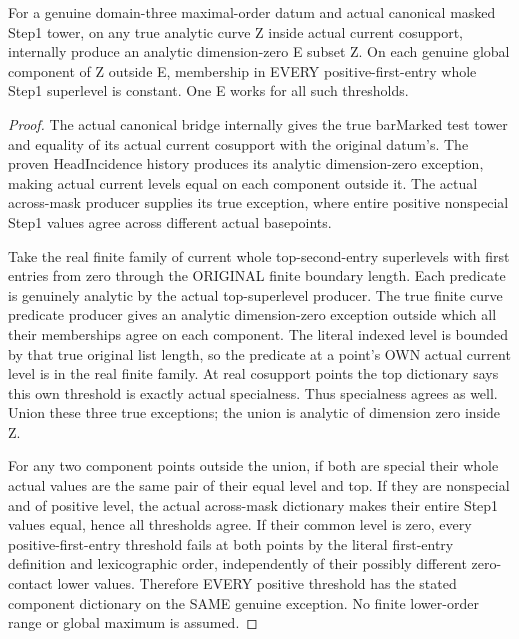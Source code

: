 \begin{theorem}
\label{hir:step-one-positive-actual-curve-threshold-dictionary}
\leanok
{}
For a genuine domain-three maximal-order datum and actual canonical masked
Step1 tower, on any true analytic curve Z inside actual current cosupport,
internally produce an analytic dimension-zero E subset Z. On each genuine
global component of Z outside E, membership in EVERY positive-first-entry
whole Step1 superlevel is constant. One E works for all such thresholds.
\end{theorem}
\begin{proof}
The actual canonical bridge internally gives the true barMarked test tower
and equality of its actual current cosupport with the original datum's.
The proven HeadIncidence history produces its analytic dimension-zero
exception, making actual current levels equal on each component outside it.
The actual across-mask producer supplies its true exception, where entire
positive nonspecial Step1 values agree across different actual basepoints.

Take the real finite family of current whole top-second-entry superlevels
with first entries from zero through the ORIGINAL finite boundary length.
Each predicate is genuinely analytic by the actual top-superlevel producer.
The true finite curve predicate producer gives an analytic dimension-zero
exception outside which all their memberships agree on each component.
The literal indexed level is bounded by that true original list length, so
the predicate at a point's OWN actual current level is in the real finite
family. At real cosupport points the top dictionary says this own threshold
is exactly actual specialness. Thus specialness agrees as well. Union these
three true exceptions; the union is analytic of dimension zero inside Z.

For any two component points outside the union, if both are special their
whole actual values are the same pair of their equal level and top. If they
are nonspecial and of positive level, the actual across-mask dictionary makes
their entire Step1 values equal, hence all thresholds agree. If their common
level is zero, every positive-first-entry threshold fails at both points by
the literal first-entry definition and lexicographic order, independently of
their possibly different zero-contact lower values. Therefore EVERY positive
threshold has the stated component dictionary on the SAME genuine exception.
No finite lower-order range or global maximum is assumed.
\end{proof}

